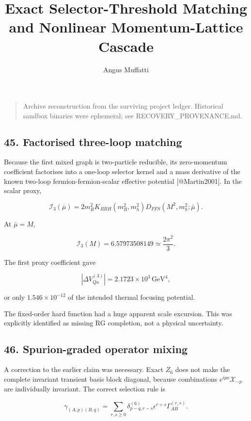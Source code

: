 \documentclass[
]{article}
\title{Exact Selector-Threshold Matching and Nonlinear Momentum-Lattice
Cascade}
\author{Angus Muffatti}
\date{}
\begin{document}
\maketitle

\begin{quote}
Archive reconstruction from the surviving project ledger. Historical
sandbox binaries were ephemeral; see RECOVERY\_PROVENANCE.md.
\end{quote}

\hypertarget{factorised-three-loop-matching}{%
\subsection{45. Factorised three-loop
matching}\label{factorised-three-loop-matching}}

Because the first mixed graph is two-particle reducible, its
zero-momentum coefficient factorises into a one-loop selector kernel and
a mass derivative of the known two-loop fermion-fermion-scalar effective
potential {[}@Martin2001{]}. In the scalar proxy,

\[
\mathcal I_3(\bar\mu)
=2m_R^2K_{RRH}(m_R^2,m_h^2)
D_{FFS}(M^2,m_h^2;\bar\mu).
\]

At \(\bar\mu=M\),

\[
\boxed{
\mathcal I_3(M)=6.57973508149\simeq\frac{2\pi^2}{3}.
}
\]

The first proxy coefficient gave

\[
|\Delta V_{Qa}^{(3)}|
=2.1723\times10^3\,\mathrm{GeV}^4,
\]

or only \(1.546\times10^{-12}\) of the intended thermal focusing
potential.

The fixed-order hard function had a huge apparent scale excursion. This
was explicitly identified as missing RG completion, not a physical
uncertainty.

\hypertarget{spurion-graded-operator-mixing}{%
\subsection{46. Spurion-graded operator
mixing}\label{spurion-graded-operator-mixing}}

A correction to the earlier claim was necessary. Exact \(Z_6\) does not
make the complete invariant transient basis block diagonal, because
combinations \(e^{ipx}\mathcal X_{-p}\) are individually invariant. The
correct selection rule is

\[
\boxed{
\gamma_{(A,p)(B,q)}
=\sum_{r,s\ge0}
\delta^{(6)}_{p-q,r-s}
\epsilon^{r+s}\Gamma_{AB}^{(r,s)}.
}
\]
\end{document}
